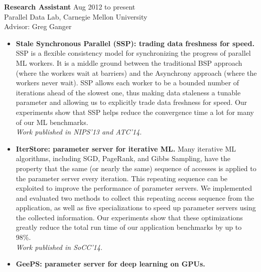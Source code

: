 \documentclass[10pt]{article}
\newenvironment{innerlist}[1][\enskip\textbullet]%
        {\begin{itemize}[#1,leftmargin=*,parsep=0pt,itemsep=0pt,topsep=0pt,partopsep=0pt]}
        {\end{itemize}}
\begin{document}
\textbf{Research Assistant} \hfill {Aug 2012 to present}\\
Parallel Data Lab, Carnegie Mellon University\\
Advisor: Greg Ganger
\begin{innerlist}
\item[] {\bf Stale Synchronous Parallel (SSP): trading data freshness for speed.}
    SSP is a flexible consistency model for synchronizing the progress of parallel ML workers. It is a middle ground between the traditional BSP approach (where the workers wait at barriers) and the Asynchrony approach (where the workers never wait). SSP allows each worker to be a bounded number of iterations ahead of the slowest one, thus making data staleness a tunable parameter and allowing us to explicitly trade data freshness for speed. Our experiments show that SSP helps reduce the convergence time a lot for many of our ML benchmarks. \\
    \emph{Work published in NIPS'13 and ATC'14.}
\vspace{.1in}
\item[] {\bf IterStore: parameter server for iterative ML.}
    Many iterative ML algorithms, including SGD, PageRank, and Gibbs Sampling, have the property that the same (or nearly the same) sequence of accesses is applied to the parameter server every iteration. This repeating sequence can be exploited to improve the performance of parameter servers. We implemented and evaluated two methods to collect this repeating access sequence from the application, as well as five specializations to speed up parameter servers using the collected information. Our experiments show that these optimizations greatly reduce the total run time of our application benchmarks by up to 98\%. \\
    \emph{Work published in SoCC'14.}
\vspace{.1in}
\item[] {\bf GeePS: parameter server for deep learning on GPUs.}

\end{innerlist}
\end{document}
